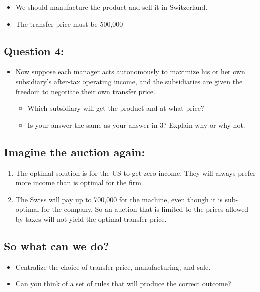 \begin{itemize}
\tightlist
\item
  We should manufacture the product and sell it in Switzerland.
\item
  The transfer price must be 500,000
\end{itemize}

\hypertarget{question-4}{%
\subsection{Question 4:}\label{question-4}}

\begin{itemize}
\tightlist
\item
  Now suppose each manager acts autonomously to maximize his or her own
  subsidiary's after-tax operating income, and the subsidiaries are
  given the freedom to negotiate their own transfer price.

  \begin{itemize}
  \tightlist
  \item
    Which subsidiary will get the product and at what price?
  \item
    Is your answer the same as your answer in 3? Explain why or why not.
  \end{itemize}
\end{itemize}

\hypertarget{imagine-the-auction-again}{%
\subsection{Imagine the auction
again:}\label{imagine-the-auction-again}}

\begin{enumerate}
\def\labelenumi{\arabic{enumi}.}
\tightlist
\item
  The optimal solution is for the US to get zero income. They will
  always prefer more income than is optimal for the firm.
\item
  The Swiss will pay up to 700,000 for the machine, even though it is
  sub-optimal for the company. So an auction that is limited to the
  prices allowed by taxes will not yield the optimal transfer price.
\end{enumerate}

\hypertarget{so-what-can-we-do}{%
\subsection{So what can we do?}\label{so-what-can-we-do}}

\begin{itemize}
\tightlist
\item
  Centralize the choice of transfer price, manufacturing, and sale.
\item
  Can you think of a set of rules that will produce the correct outcome?
\end{itemize}
